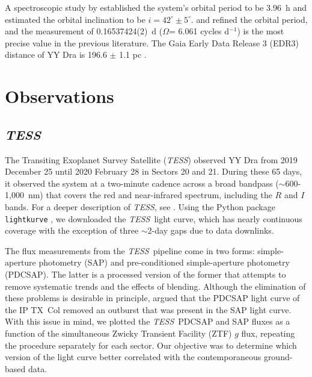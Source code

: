 \documentclass[twocolumn]{aastex63}
\newcommand{\orbit}{$\Omega$}
\newcommand{\TESS}{\textit{TESS}}
\begin{document}
A spectroscopic study by \cite{Matteo91} established the system's orbital period to be 3.96~h and estimated the orbital inclination to be $i = 42^{\circ}\pm5^{\circ}$. \citet{haswell} and \citet{joshi_yy_dra} refined the orbital period, and the \citet{joshi_yy_dra} measurement of 0.16537424(2)~d (\orbit = 6.061 cycles d$^{-1}$) is the most precise value in the previous literature. 
The Gaia Early Data Release 3 (EDR3) distance of YY Dra is 196.6 $\pm$ 1.1 pc \citep{BJ21}.

\section{Observations}


\subsection{\TESS}
The Transiting Exoplanet Survey Satellite (\TESS) observed YY Dra from 2019 December 25 until 2020 February 28 in Sectors 20 and 21. During these 65 days, it observed the system at a two-minute cadence across a broad bandpass ($\sim$600-1,000~nm) that covers the red and near-infrared spectrum, including the $R$ and $I$ bands. For a deeper description of \TESS, see \citet{Ricker2015}. Using the Python package {\tt lightkurve} \citep{Lightkurve20}, we downloaded the \TESS\ light curve, which has nearly continuous coverage with the exception of three $\sim$2-day gaps due to data downlinks. 

The flux measurements from the \TESS\ pipeline come in two forms: simple-aperture photometry (SAP) and pre-conditioned simple-aperture photometry (PDCSAP). The latter is a processed version of the former that attempts to remove systematic trends and the effects of blending. Although the elimination of these problems is desirable in principle, \citet{littlefield21} argued that the PDCSAP light curve of the IP TX~Col removed an outburst that was present in the SAP light curve. With this issue in mind, we plotted the \TESS\ PDCSAP and SAP fluxes as a function of the simultaneous Zwicky Transient Facility (ZTF) \citep{Smith19} $g$ flux, repeating the procedure separately for each sector. Our objective was to determine which version of the light curve better correlated with the contemporaneous ground-based data. 
\end{document}

